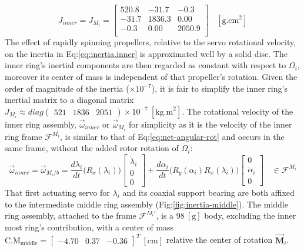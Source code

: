 \begin{equation} \label{eq:inertia.inner}
J_{inner}=J_{M_i}=\begin{bmatrix}
520.8 & -31.7	& -0.3\\
-31.7 & 1836.3 & 0.00\\
-0.3 & 0.00	& 2050.9\\
\end{bmatrix}~~~~[\text{g.cm}^2]
\end{equation}
The effect of rapidly spinning propellers, relative to the servo rotational velocity, on the inertia in Eq:\ref{eq:inertia.inner} is approximated well by a solid disc. The inner ring's inertial components are then regarded as constant with respect to $\Omega_i$, moreover its center of mass is independent of that propeller's rotation. Given the order of magnitude of the inertia ($\times 10^{-7}$), it is fair to simplify the inner ring's inertial matrix to a diagonal matrix $J_{M_i}\approx diag\begin{pmatrix}521&1836&2051\end{pmatrix}\times10^{-7}~[\text{kg.m}^2]$. The rotational velocity of the inner ring assembly, $\vec{\omega}_{inner}$ or $\vec{\omega}_{M_i}$ for simplicity as it is the velocity of the inner ring frame $\mathcal{F}^{M_i}$, is similar to that of Eq:\ref{eq:net-angular-rot} and occurs in the same frame, without the added rotor rotation of $\Omega_i$:
\begin{equation}\label{eq:net-angular-inner}
\vec{\omega}_{inner}=\vec{\omega}_{M_i/b}=\frac{d\lambda_i}{dt}\big(R_x(\lambda_i)\big)\begin{bmatrix}
\dot{\lambda}_i\\
0\\
0
\end{bmatrix}
+\frac{d\alpha_i}{dt}\big(R_y(\alpha_i)R_x(\lambda_i)\big)\begin{bmatrix}
0\\
\dot{\alpha}_i\\
0
\end{bmatrix}~~~~\in\mathcal{F}^{M_i}
\end{equation}
That first actuating servo for $\lambda_i$ and its coaxial support bearing are both affixed to the intermediate middle ring assembly (Fig:\ref{fig:inertia-middle}). The middle ring assembly, attached to the frame $\mathcal{F}^{M_i'}$, is a $98~[\text{g}]$ body, excluding the inner most ring's contribution, with a center of mass $\text{C.M}_{\text{middle}}=\begin{bmatrix}
-4.70&0.37&-0.36\end{bmatrix}^T~[\text{cm}]$ relative the center of rotation $\vec{\mathbf{M}}_i$.
